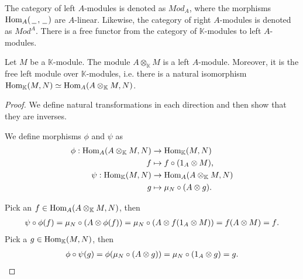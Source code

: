 \documentclass[../thesis.tex]{subfiles}
\begin{document}
                The category of left $A$-modules is denoted as $Mod_A$, where the morphisms $\tt{Hom}_A(\argument,\argument)$ are $A$-linear. Likewise, the category of right $A$-modules is denoted as $Mod^A$. There is a free functor from the category of $\mathbb{K}$-modules to left $A$-modules.

                \begin{proposition}\label{prop: free-mod}
                    Let $M$ be a $\mathbb{K}$-module. The module $A\otimes_{\mathbb{K}}M$ is a left $A$-module. Moreover, it is the free left module over $\mathbb{K}$-modules, i.e. there is a natural isomorphism $\tt{Hom}_{\mathbb{K}}(M,N)\simeq \tt{Hom}_{A}(A\otimes_{\mathbb{K}}M,N)$.
                \end{proposition}

                \begin{proof}
                    We define natural transformations in each direction and then show that they are inverses.

                    We define morphisms $\phi$ and $\psi$ as
                    \begin{align*}
                        \phi : \tt{Hom}_A(A\otimes_\mathbb{K}M, N) & \rightarrow \tt{Hom}_\mathbb{K}(M,N) \\
                        f & \mapsto f \circ (1_A \otimes M)\tt{,} \\
                        \psi : \tt{Hom}_\mathbb{K}(M, N) & \rightarrow \tt{Hom}_A(A\otimes_\mathbb{K}M, N) \\
                        g & \mapsto \mu_N \circ (A \otimes g)\tt{.}
                    \end{align*}

                    Pick an $f \in \tt{Hom}_A(A\otimes_\mathbb{K}M, N)$, then
                    \begin{align*}
                            \psi\circ\phi (f) = \mu_N \circ (A \otimes \phi (f)) = \mu_N \circ (A \otimes f (1_A \otimes M)) = f (A \otimes M) = f\tt{.}
                    \end{align*}
                    Pick a $g \in \tt{Hom}_\mathbb{K}(M,N)$, then
                    \begin{align*}
                        \phi\circ\psi (g) = \phi (\mu_N \circ (A \otimes g)) = \mu_N \circ (1_A \otimes g) = g\tt{.}
                    \end{align*}
                \end{proof}
\end{document}
